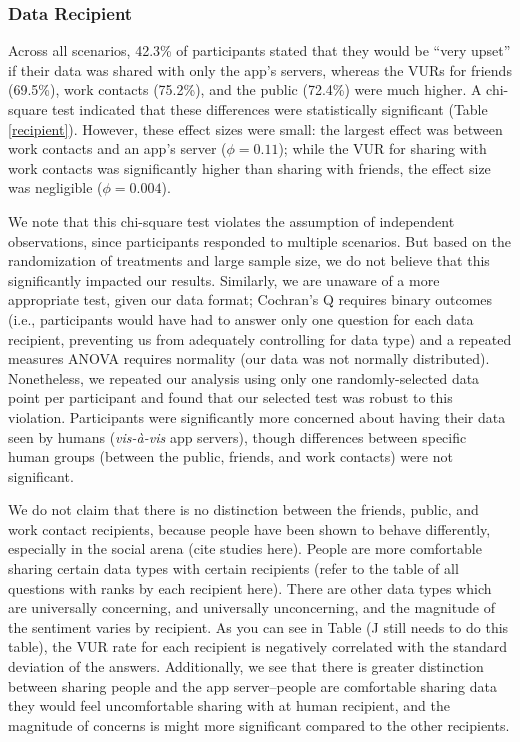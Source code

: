 
\subsubsection{Data Recipient}
Across all scenarios, 42.3\% of participants stated that they would be ``very upset'' if their data was shared with only the app's servers, whereas the VURs for friends (69.5\%), work contacts (75.2\%), and the public (72.4\%) were much higher. A chi-square test indicated that these differences were statistically significant (Table \ref{recipient}). However, these effect sizes were small: the largest effect was between work contacts and an app's server ($\phi=0.11$); while the VUR for sharing with work contacts was significantly higher than sharing with friends, the effect size was negligible ($\phi=0.004$). 

We note that this chi-square test violates the assumption of independent observations, since participants responded to multiple scenarios. But based on the randomization of treatments and large sample size, we do not believe that this significantly impacted our results. Similarly, we are unaware of a more appropriate test, given our data format; Cochran's Q requires binary outcomes (i.e., participants would have had to answer only one question for each data recipient, preventing us from adequately controlling for data type) and a repeated measures ANOVA requires normality (our data was not normally distributed). Nonetheless, we repeated our analysis using only one randomly-selected data point per participant and found that our selected test was robust to this violation. Participants were significantly more concerned about having their data seen by humans ({\it vis-{\`a}-vis} app servers), though differences between specific human groups (between the public, friends, and work contacts) were not significant. 

{\color {red} We do not claim that there is no distinction between the friends, public, and work contact recipients, because people have been shown to behave differently, especially in the social arena (cite studies here). People are more comfortable sharing certain data types with certain recipients (refer to the table of all questions with ranks by each recipient here). There are other data types which are universally concerning, and universally unconcerning, and the magnitude of the sentiment varies by recipient. As you can see in Table (J still needs to do this table), the VUR rate for each recipient is negatively correlated with the standard deviation of the answers.  Additionally, we see that there is greater distinction between sharing people and the app server--people are comfortable sharing data they would feel uncomfortable sharing with at human recipient, and the magnitude of concerns is might more significant compared to the other recipients.}
